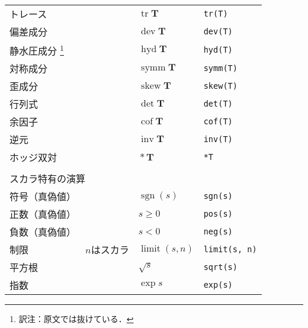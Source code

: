 \begin{longtable}{Xlll}
 トレース &  & $\mathop{\mathrm{tr}}\bm{T}$ & \verb|tr(T)| \\
\index{tensorのメンバかんすう@\OFclass{tensor}のメンバ関数!dev@\verb+dev+}%
\index{dev@\verb+dev+!tensorのメンバかんすう@\OFclass{tensor}のメンバ関数}%
 偏差成分 &  & $\mathop{\mathrm{dev}}\bm{T}$ & \verb|dev(T)| \\
 静水圧成分%
\footnote{訳注：原文では抜けている．}%
 &  & $\mathop{\mathrm{hyd}}\bm{T}$ & \verb|hyd(T)| \\
\index{tensorのメンバかんすう@\OFclass{tensor}のメンバ関数!symm@\verb+symm+}%
\index{symm@\verb+symm+!tensorのメンバかんすう@\OFclass{tensor}のメンバ関数}%
 対称成分 &  & $\mathop{\mathrm{symm}}\bm{T}$ & \verb|symm(T)| \\
\index{tensorのメンバかんすう@\OFclass{tensor}のメンバ関数!skew@\verb+skew+}%
\index{skew@\verb+skew+!tensorのメンバかんすう@\OFclass{tensor}のメンバ関数}%
 歪成分 &  & $\mathop{\mathrm{skew}}\bm{T}$ & \verb|skew(T)| \\
\index{tensorのメンバかんすう@\OFclass{tensor}のメンバ関数!det@\verb+det+}%
\index{det@\verb+det+!tensorのメンバかんすう@\OFclass{tensor}のメンバ関数}%
 行列式 &  & $\det\bm{T}$ & \verb|det(T)| \\
\index{tensorのメンバかんすう@\OFclass{tensor}のメンバ関数!cof@\verb+cof+}%
\index{cof@\verb+cof+!tensorのメンバかんすう@\OFclass{tensor}のメンバ関数}%
 余因子 &  & $\mathop{\mathrm{cof}}\bm{T}$ & \verb|cof(T)| \\
\index{tensorのメンバかんすう@\OFclass{tensor}のメンバ関数!inv@\verb+inv+}%
\index{inv@\verb+inv+!tensorのメンバかんすう@\OFclass{tensor}のメンバ関数}%
 逆元 &  & $\mathop{\mathrm{inv}}\bm{T}$ & \verb|inv(T)| \\
 ホッジ双対 &  & $\mathop{*}\bm{T}$ & \verb|*T| \\
 \\
 \multicolumn{4}{l}{\sffamily\gtfamily スカラ特有の演算} \\
 \hline
 \tblstrut
 符号（真偽値） &  & $\mathop{\mathrm{sgn}}(s)$ & \verb|sgn(s)| \\
 正数（真偽値） &  & $s \ge 0$ & \verb|pos(s)| \\
 負数（真偽値） &  & $s < 0$ & \verb|neg(s)| \\
 制限 & $n$はスカラ & $\mathop{\mathrm{limit}}(s, n)$ & \verb|limit(s, n)| \\
 平方根 &  & $\sqrt{s}$ & \verb|sqrt(s)| \\
 指数 &  & $\exp s$ & \verb|exp(s)| \\

\end{longtable}
